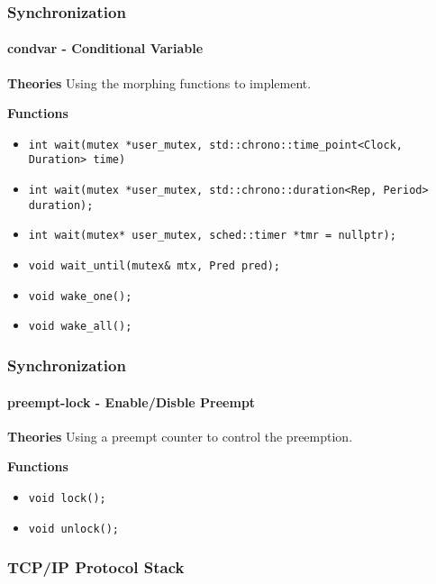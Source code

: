 \documentclass[10pt]{beamer}
\begin{document}
\begin{frame}
	\frametitle{Synchronization}
	\framesubtitle{condvar - Conditional Variable}

	\textbf{Theories}
	Using the morphing functions to implement.
	
	\smallskip

	\textbf{Functions}
	\begin{itemize}
		\item \texttt{int wait(mutex *user\_mutex, std::chrono::time\_point<Clock, Duration> time)}
		\item \texttt{int wait(mutex *user\_mutex, std::chrono::duration<Rep, Period> duration);}
		\item \texttt{int wait(mutex* user\_mutex, sched::timer *tmr = nullptr);}
		\item \texttt{void wait\_until(mutex\& mtx, Pred pred);}
		\item \texttt{void wake\_one();}
		\item \texttt{void wake\_all();}
	\end{itemize}
	
\end{frame}

\begin{frame}
	\frametitle{Synchronization}
	\framesubtitle{preempt-lock - Enable/Disble Preempt}

	\textbf{Theories}
	Using a preempt counter to control the preemption.
	
	\smallskip

	\textbf{Functions}
	\begin{itemize}
		\item \texttt{void lock();}
		\item \texttt{void unlock();}
	\end{itemize}
	
\end{frame}

\begin{frame}
	\frametitle{TCP/IP Protocol Stack}

\end{frame}
\end{document}
